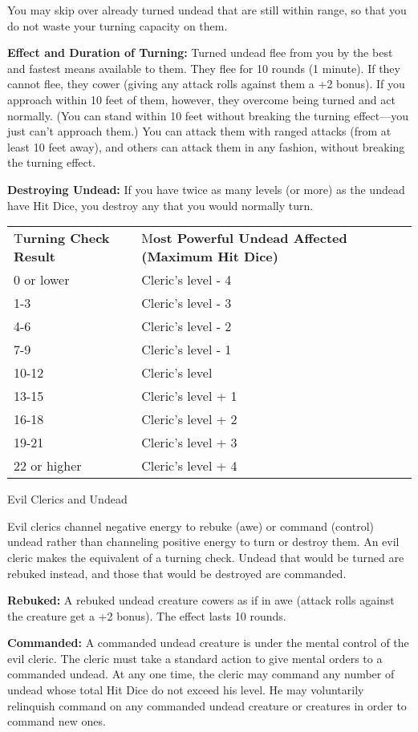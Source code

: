 \documentclass{article}
\begin{document}
You may skip over already turned undead that are still within range, so that you 
do not waste your turning capacity on them.

\textbf{Effect and Duration of Turning:} Turned undead flee from you by the best 
and fastest means available to them. They flee for 10 rounds (1 minute). If they 
cannot flee, they cower (giving any attack rolls against them a +2 bonus). If you 
approach within 10 feet of them, however, they overcome being turned and act normally. 
(You can stand within 10 feet without breaking the turning effect---you just can't 
approach them.) You can attack them with ranged attacks (from at least 10 feet 
away), and others can attack them in any fashion, without breaking the turning 
effect.

\textbf{Destroying Undead:} If you have twice as many levels (or more) as the undead 
have Hit Dice, you destroy any that you would normally turn.

\vspace{12pt}
\begin{tabular}{|>{\raggedright}p{56pt}|>{\raggedright}p{132pt}|}
\hline
\multicolumn{2}{|p{188pt}|}{T\textbf{able: Turning Undead}}\tabularnewline
\hline
T\textbf{urning Check Result} & M\textbf{ost Powerful Undead Affected (Maximum 
Hit Dice)}\tabularnewline
\hline
0 or lower & Cleric's level - 4\tabularnewline
\hline
1-3 & Cleric's level - 3\tabularnewline
\hline
4-6 & Cleric's level - 2\tabularnewline
\hline
7-9 & Cleric's level - 1\tabularnewline
\hline
10-12 & Cleric's level\tabularnewline
\hline
13-15 & Cleric's level + 1\tabularnewline
\hline
16-18 & Cleric's level + 2\tabularnewline
\hline
19-21 & Cleric's level + 3\tabularnewline
\hline
22 or higher & Cleric's level + 4\tabularnewline
\hline
\end{tabular}

\vspace{12pt}
Evil Clerics and Undead

Evil clerics channel negative energy to rebuke (awe) or command (control) undead 
rather than channeling positive energy to turn or destroy them. An evil cleric 
makes the equivalent of a turning check. Undead that would be turned are rebuked 
instead, and those that would be destroyed are commanded.

\textbf{Rebuked:} A rebuked undead creature cowers as if in awe (attack rolls against 
the creature get a +2 bonus). The effect lasts 10 rounds.

\textbf{Commanded:} A commanded undead creature is under the mental control of 
the evil cleric. The cleric must take a standard action to give mental orders to 
a commanded undead. At any one time, the cleric may command any number of undead 
whose total Hit Dice do not exceed his level. He may voluntarily relinquish command 
on any commanded undead creature or creatures in order to command new ones.
\end{document}
